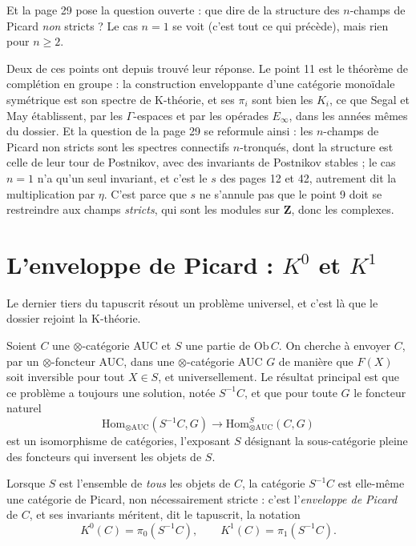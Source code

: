 \documentclass[11pt,a4paper]{article}
\begin{document}
Et la page 29 pose la question ouverte : que dire de la structure des
$n$-champs de Picard \emph{non} stricts ? Le cas $n = 1$ se voit (c'est tout
ce qui précède), mais rien pour $n \geq 2$.

Deux de ces points ont depuis trouvé leur réponse. Le
point 11 est le théorème de complétion en groupe : la construction
enveloppante d'une catégorie monoïdale symétrique est son spectre de
K-théorie, et ses $\pi_{i}$ sont bien les $K_{i}$, ce que Segal et May
établissent, par les $\Gamma$-espaces et par les opérades $E_{\infty}$, dans
les années mêmes du dossier. Et la question de la page 29 se reformule ainsi :
les $n$-champs de Picard non stricts sont les spectres connectifs $n$-tronqués,
dont la structure est celle de leur tour de Postnikov, avec des invariants de
Postnikov stables ; le cas $n = 1$ n'a qu'un seul invariant, et c'est le $s$
des pages 12 et 42, autrement dit la multiplication par $\eta$. C'est parce que $s$ ne s'annule pas que le point 9 doit se restreindre
aux champs \emph{stricts}, qui sont les modules sur $\mathbf{Z}$, donc les
complexes.

\section*{L'enveloppe de Picard : $K^{0}$ et $K^{1}$}

Le dernier tiers du tapuscrit résout un problème universel, et c'est là que le
dossier rejoint la K-théorie.

Soient $C$ une $\otimes$-catégorie AUC et $S$ une partie de
$\mathrm{Ob}\,C$. On cherche à envoyer $C$, par un $\otimes$-foncteur AUC,
dans une $\otimes$-catégorie AUC $G$ de manière que $F(X)$ soit inversible
pour tout $X \in S$, et universellement. Le résultat principal est que ce
problème a toujours une solution, notée $S^{-1}C$, et que pour toute $G$ le
foncteur naturel
\[
\mathrm{Hom}_{\otimes \mathrm{AUC}}(S^{-1}C, G) \longrightarrow
\mathrm{Hom}^{S}_{\otimes \mathrm{AUC}}(C, G)
\]
est un isomorphisme de catégories, l'exposant $S$ désignant la sous-catégorie
pleine des foncteurs qui inversent les objets de $S$.

Lorsque $S$ est l'ensemble de \emph{tous} les objets de $C$, la catégorie
$S^{-1}C$ est elle-même une catégorie de Picard, non nécessairement stricte :
c'est l'\emph{enveloppe de Picard} de $C$, et ses invariants méritent, dit le
tapuscrit, la notation
\[
K^{0}(C) = \pi_{0}(S^{-1}C), \qquad K^{1}(C) = \pi_{1}(S^{-1}C).
\]
\end{document}
